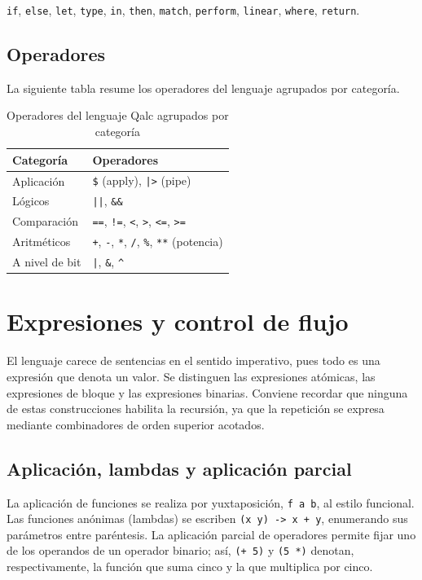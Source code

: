 \lstinline|if|, \lstinline|else|, \lstinline|let|, \lstinline|type|, \lstinline|in|, \lstinline|then|, \lstinline|match|, \lstinline|perform|, \lstinline|linear|, \lstinline|where|, \lstinline|return|.

\subsection{Operadores}

La siguiente tabla resume los operadores del lenguaje agrupados por categoría.

\begin{table}[!ht]
\centering
\caption{Operadores del lenguaje Qalc agrupados por categoría}
\label{tab:operadores}
\small
\begin{tabularx}{\textwidth}{lX}
\toprule
\textbf{Categoría} & \textbf{Operadores} \\
\midrule
Aplicación & \texttt{\$} (apply), \texttt{|>} (pipe) \\
Lógicos & \texttt{||}, \texttt{\&\&} \\
Comparación & \texttt{==}, \texttt{!=}, \texttt{<}, \texttt{>}, \texttt{<=}, \texttt{>=} \\
Aritméticos & \texttt{+}, \texttt{-}, \texttt{*}, \texttt{/}, \texttt{\%}, \texttt{**} (potencia) \\
A nivel de bit & \texttt{|}, \texttt{\&}, \texttt{\textasciicircum} \\
\bottomrule
\end{tabularx}
\end{table}

\section{Expresiones y control de flujo}

El lenguaje carece de sentencias en el sentido imperativo, pues todo es una expresión que denota un valor. Se distinguen las expresiones atómicas, las expresiones de bloque y las expresiones binarias. Conviene recordar que ninguna de estas construcciones habilita la recursión, ya que la repetición se expresa mediante combinadores de orden superior acotados.

\subsection{Aplicación, lambdas y aplicación parcial}

La aplicación de funciones se realiza por yuxtaposición, \lstinline|f a b|, al estilo funcional. Las funciones anónimas (lambdas) se escriben \lstinline|(x y) -> x + y|, enumerando sus parámetros entre paréntesis. La aplicación parcial de operadores permite fijar uno de los operandos de un operador binario; así, \lstinline|(+ 5)| y \lstinline|(5 *)| denotan, respectivamente, la función que suma cinco y la que multiplica por cinco.

